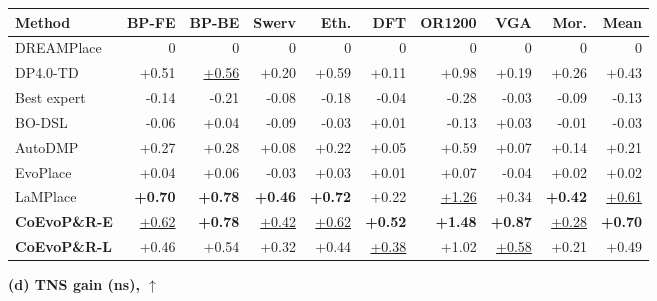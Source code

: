 \begin{table}[t]
\begin{minipage}[t]{0.492\textwidth}
\begin{tabular*}{\linewidth}{
  @{\extracolsep{\fill}} l *{9}{r} @{}
}
\toprule
Method
& BP-FE & BP-BE & Swerv & Eth.
& DFT & OR1200 & VGA & Mor. & Mean \\
\midrule
DREAMPlace       & 0 & 0 & 0 & 0 & 0 & 0 & 0 & 0 & 0 \\
DP4.0-TD         & +0.51 & \cellcolor{ranksecond}\underline{+0.56} & +0.20 & +0.59 & +0.11 & +0.98 & +0.19 & +0.26 & +0.43 \\
Best expert      & -0.14 & -0.21 & -0.08 & -0.18 & -0.04 & -0.28 & -0.03 & -0.09 & -0.13 \\
BO-DSL           & -0.06 & +0.04 & -0.09 & -0.03 & +0.01 & -0.13 & +0.03 & -0.01 & -0.03 \\
AutoDMP          & +0.27 & +0.28 & +0.08 & +0.22 & +0.05 & +0.59 & +0.07 & +0.14 & +0.21 \\
EvoPlace         & +0.04 & +0.06 & -0.03 & +0.03 & +0.01 & +0.07 & -0.04 & +0.02 & +0.02 \\
LaMPlace         & \cellcolor{rankfirst}\textbf{+0.70} & \cellcolor{rankfirst}\textbf{+0.78} & \cellcolor{rankfirst}\textbf{+0.46} & \cellcolor{rankfirst}\textbf{+0.72} & +0.22 & \cellcolor{ranksecond}\underline{+1.26} & +0.34 & \cellcolor{rankfirst}\textbf{+0.42} & \cellcolor{ranksecond}\underline{+0.61} \\
\midrule
\textbf{CoEvoP\&R-E}
                 & \cellcolor{ranksecond}\underline{+0.62} & \cellcolor{rankfirst}\textbf{+0.78} & \cellcolor{ranksecond}\underline{+0.42} & \cellcolor{ranksecond}\underline{+0.62} & \cellcolor{rankfirst}\textbf{+0.52} & \cellcolor{rankfirst}\textbf{+1.48} & \cellcolor{rankfirst}\textbf{+0.87} & \cellcolor{ranksecond}\underline{+0.28} & \cellcolor{rankfirst}\textbf{+0.70} \\
\textbf{CoEvoP\&R-L}
                 & +0.46 & +0.54 & +0.32 & +0.44 & \cellcolor{ranksecond}\underline{+0.38} & +1.02 & \cellcolor{ranksecond}\underline{+0.58} & +0.21 & +0.49 \\
\bottomrule
\end{tabular*}
\end{minipage}
\hfill%
\begin{minipage}[t]{0.492\textwidth}
\centering
\textbf{(d) TNS gain (ns), $\uparrow$}\par
\vspace{2pt}
\setlength{\tabcolsep}{0.5pt}


\end{minipage}
\end{table}
